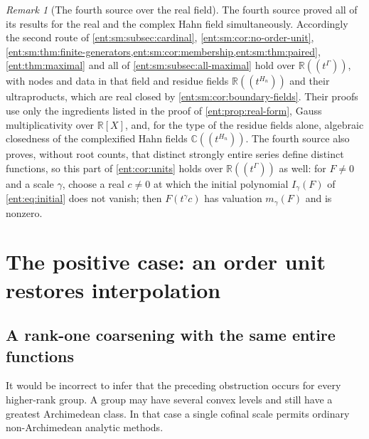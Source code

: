 \documentclass[11pt]{article}
\theoremstyle{plain}
\theoremstyle{plain}
\theoremstyle{plain}
\theoremstyle{definition}
\theoremstyle{definition}
\theoremstyle{definition}
\theoremstyle{definition}
\theoremstyle{remark}
\newtheorem{remark}[remark]{Remark}
\newcommand{\C}{\mathbb C}\newcommand{\R}{\mathbb R}
\begin{document}
\begin{remark}[The fourth source over the real field]\label{ent:sm:rem:real}
The fourth source proved all of its results for the real and the complex
Hahn field simultaneously. Accordingly the second route of
\cref{ent:sm:subsec:cardinal}, \cref{ent:sm:cor:no-order-unit},
\cref{ent:sm:thm:finite-generators,ent:sm:cor:membership,ent:sm:thm:paired},
\cref{ent:thm:maximal} and all of \cref{ent:sm:subsec:all-maximal} hold over
$\R((t^\Gamma))$, with nodes and data in that field and residue fields
$\R((t^{H_n}))$ and their ultraproducts, which are real closed by
\cref{ent:sm:cor:boundary-fields}. Their proofs use only the ingredients
listed in the proof of \cref{ent:prop:real-form}, Gauss multiplicativity over
$\R[X]$, and, for the type of the residue fields alone, algebraic closedness
of the complexified Hahn fields $\C((t^{H_n}))$. The fourth source also
proves, without root counts, that distinct strongly entire series define
distinct functions, so this part of \cref{ent:cor:units} holds over
$\R((t^\Gamma))$ as well: for $F\ne0$ and a scale $\gamma$, choose a real
$c\ne0$ at which the initial polynomial $I_\gamma(F)$ of
\eqref{ent:eq:initial} does not vanish; then $F(t^\gamma c)$ has valuation
$m_\gamma(F)$ and is nonzero.
\end{remark}


\section{The positive case: an order unit restores interpolation}
\label{ent:sec:positive}

\subsection{A rank-one coarsening with the same entire functions}
It would be incorrect to infer that the preceding obstruction occurs for
every higher-rank group. A group may have several convex levels and still
have a greatest Archimedean class. In that case a single cofinal scale
permits ordinary non-Archimedean analytic methods.
\end{document}
